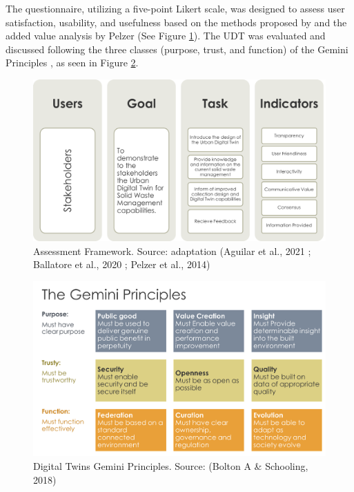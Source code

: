 \documentclass[authoryear,preprint,review,doubleblind, 12pt]{elsarticle}
\begin{document}
    The questionnaire, utilizing a five-point Likert scale, was designed to assess user satisfaction, usability, and usefulness based on the methods proposed by \citet{Ballatore2020} and the added value analysis by Pelzer \citep{Pelzer2014} (See Figure \ref{fig:AssesmentFr}). The UDT was evaluated and discussed following the three classes (purpose, trust, and function) of the Gemini Principles \citep{aGeminiPrinciplesGuiding2018}, as seen in Figure \ref{fig:DTPrinciples}.

    \begin{figure}[H]    
    \centering
    \includegraphics[width=\linewidth]{Figures/AssesmentFr.png}
        \caption{Assessment Framework.
        Source: adaptation (Aguilar et al., 2021 ; Ballatore et al., 2020 ; Pelzer et al., 2014)}
        \label{fig:AssesmentFr}
    \end{figure}

    \begin{figure}[H]
    \centering
    \includegraphics[width=0.8\linewidth]{Figures/Gemini.png}
        \caption{Digital Twins Gemini Principles. Source: (Bolton A \& Schooling, 2018)}
        \label{fig:DTPrinciples}
    \end{figure}
\end{document}
